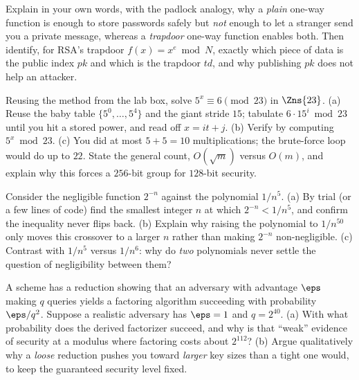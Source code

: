 \begin{exercise}
\label{ch08:ex-9}
Explain in your own words, with the padlock analogy, why a \emph{plain} one-way function is enough to store passwords safely but \emph{not} enough to let a stranger send you a private message, whereas a \emph{trapdoor} one-way function enables both. Then identify, for RSA's trapdoor $f(x)=x^e \bmod N$, exactly which piece of data is the public index $pk$ and which is the trapdoor $td$, and why publishing $pk$ does not help an attacker.
\end{exercise}

\begin{exercise}
\label{ch08:ex-11}
Reusing the method from the lab box, solve $5^{x}\equiv 6 \pmod{23}$ in $\Zns{23}$. (a) Reuse the baby table $\{5^{0},\dots,5^{4}\}$ and the giant stride $15$; tabulate $6\cdot 15^{i}\bmod 23$ until you hit a stored power, and read off $x = it + j$. (b) Verify by computing $5^{x}\bmod 23$. (c) You did at most $5+5 = 10$ multiplications; the brute-force loop would do up to $22$. State the general count, $O(\sqrt m)$ versus $O(m)$, and explain why this forces a $256$-bit group for $128$-bit security.
\end{exercise}

\begin{exercise}
\label{ch08:ex-12}
Consider the negligible function $2^{-n}$ against the polynomial $1/n^{5}$. (a) By trial (or a few lines of code) find the smallest integer $n$ at which $2^{-n} < 1/n^{5}$, and confirm the inequality never flips back. (b) Explain why raising the polynomial to $1/n^{50}$ only moves this crossover to a larger $n$ rather than making $2^{-n}$ non-negligible. (c) Contrast with $1/n^{5}$ versus $1/n^{6}$: why do \emph{two} polynomials never settle the question of negligibility between them?
\end{exercise}

\begin{exercise}
\label{ch08:ex-10}
A scheme has a reduction showing that an adversary with advantage $\eps$ making $q$ queries yields a factoring algorithm succeeding with probability $\eps / q^{2}$. Suppose a realistic adversary has $\eps = 1$ and $q = 2^{40}$. (a) With what probability does the derived factorizer succeed, and why is that ``weak'' evidence of security at a modulus where factoring costs about $2^{112}$? (b) Argue qualitatively why a \emph{loose} reduction pushes you toward \emph{larger} key sizes than a tight one would, to keep the guaranteed security level fixed.
\end{exercise}
